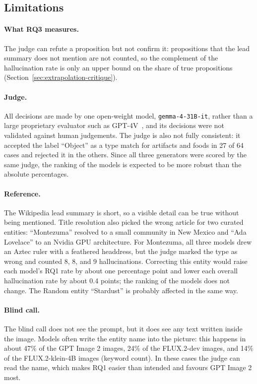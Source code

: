 \subsection{Limitations}
\label{sec:limitations}

\paragraph{What RQ3 measures.} The judge can refute a proposition but not
confirm it: propositions that the lead summary does not mention are not
counted, so the complement of the hallucination rate is only an upper bound on
the share of true propositions (Section~\ref{sec:extrapolation-critique}).

\paragraph{Judge.} All decisions are made by one open-weight model,
\texttt{gemma-4-31B-it}, rather than a large proprietary evaluator such as
GPT-4V~\citep{gpt4v2024}, and its decisions were not validated against human
judgements. The judge is also not fully consistent: it accepted the label
``Object'' as a type match for artifacts and foods in 27 of 64 cases and
rejected it in the others. Since all three generators were scored by the same
judge, the ranking of the models is expected to be more robust than the
absolute percentages.

\paragraph{Reference.} The Wikipedia lead summary is short, so a visible
detail can be true without being mentioned. Title resolution also picked the
wrong article for two curated entities: ``Montezuma'' resolved to a small
community in New Mexico and ``Ada Lovelace'' to an Nvidia GPU architecture. For
Montezuma, all three models drew an Aztec ruler with a feathered headdress, but
the judge marked the type as wrong and counted 8, 8, and 9 hallucinations.
Correcting this entity would raise each model's RQ1 rate by about one
percentage point and lower each overall hallucination rate by about 0.4 points;
the ranking of the models does not change. The Random entity ``Stardust'' is
probably affected in the same way.

\paragraph{Blind call.} The blind call does not see the prompt, but it does see
any text written inside the image. Models often write the entity name into the picture:
this happens in about 47\% of the GPT Image 2 images, 24\% of the FLUX.2-dev
images, and 14\% of the FLUX.2-klein-4B images (keyword count). In these cases
the judge can read the name, which makes RQ1 easier than intended and
favours GPT Image 2 most.


